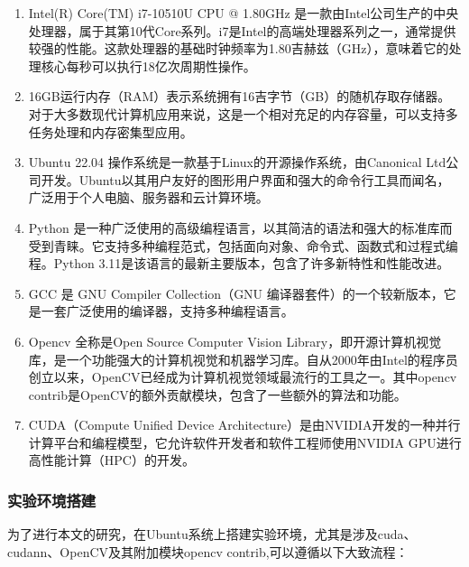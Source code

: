 \begin{enumerate}
\item Intel(R) Core(TM) i7-10510U CPU @ 1.80GHz 是一款由Intel公司生产的中央处理器，属于其第10代Core系列。i7是Intel的高端处理器系列之一，通常提供较强的性能。这款处理器的基础时钟频率为1.80吉赫兹（GHz），意味着它的处理核心每秒可以执行18亿次周期性操作。

\item 16GB运行内存（RAM）表示系统拥有16吉字节（GB）的随机存取存储器。对于大多数现代计算机应用来说，这是一个相对充足的内存容量，可以支持多任务处理和内存密集型应用。

\item Ubuntu 22.04 操作系统是一款基于Linux的开源操作系统，由Canonical Ltd公司开发。Ubuntu以其用户友好的图形用户界面和强大的命令行工具而闻名，广泛用于个人电脑、服务器和云计算环境。

\item Python 是一种广泛使用的高级编程语言，以其简洁的语法和强大的标准库而受到青睐。它支持多种编程范式，包括面向对象、命令式、函数式和过程式编程。Python 3.11是该语言的最新主要版本，包含了许多新特性和性能改进。

\item GCC 是 GNU Compiler Collection（GNU 编译器套件）的一个较新版本，它是一套广泛使用的编译器，支持多种编程语言。

\item Opencv 全称是Open Source Computer Vision Library，即开源计算机视觉库，是一个功能强大的计算机视觉和机器学习库。自从2000年由Intel的程序员创立以来，OpenCV已经成为计算机视觉领域最流行的工具之一。其中opencv contrib是OpenCV的额外贡献模块，包含了一些额外的算法和功能。

\item CUDA（Compute Unified Device Architecture）是由NVIDIA开发的一种并行计算平台和编程模型，它允许软件开发者和软件工程师使用NVIDIA GPU进行高性能计算（HPC）的开发。

\end{enumerate}

\subsubsection{实验环境搭建}

为了进行本文的研究，在Ubuntu系统上搭建实验环境，尤其是涉及cuda、cudann、OpenCV及其附加模块opencv contrib,可以遵循以下大致流程：

